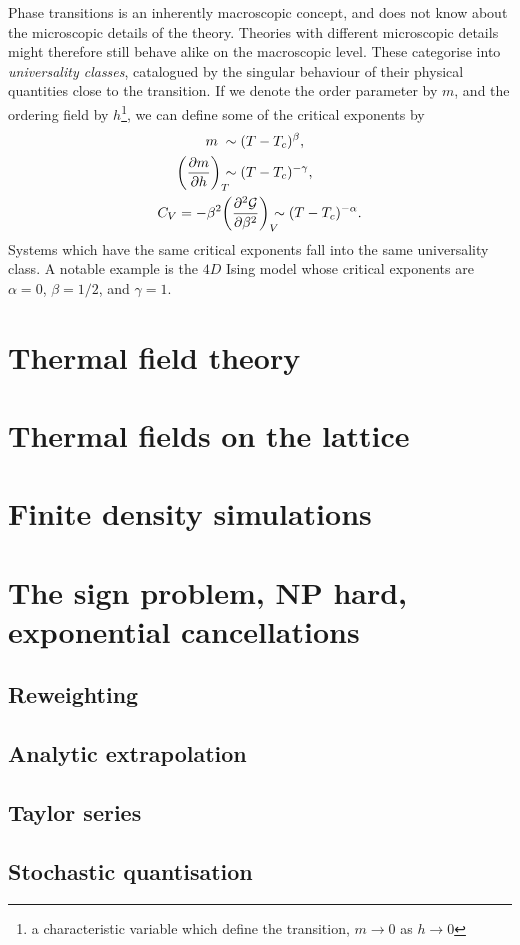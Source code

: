 Phase transitions is an inherently macroscopic concept, and does not know about
the microscopic details of the theory. Theories with different microscopic
details might therefore still behave alike on the macroscopic level. These
categorise into \emph{universality classes}, catalogued by the singular
behaviour of their physical quantities close to the transition. If we denote the
order parameter by $m$, and the ordering field by $h$\footnote{a characteristic
variable which define the transition, $m\to0$ as $h\to0$}, we can define some of
the critical exponents by
%
\begin{align}
  m \;&\sim (T - T_c)^{\beta}, \\
  \bigg(\frac{\partial m}{\partial h}\bigg)_{\mathrlap{T}} &\sim (T - T_c)^{-\gamma}, \\
  C_V = - \beta^2 &\bigg(\frac{\partial^2 \mathcal{G}}{\partial
    \beta^2}\bigg)_{\mathrlap{V}} \sim (T - T_c)^{-\alpha}.
\end{align}
%
Systems which have the same critical exponents fall into the same universality
class. A notable example is the $4D$ Ising model whose critical exponents are
$\alpha = 0$, $\beta = 1/2$, and $\gamma = 1$.


\section{Thermal field theory} \label{sec-thermal-field-theory}

\section{Thermal fields on the lattice} \label{sec-thermal-lattice-theory}

\section{Finite density simulations} \label{sec-finite-density-lattice}

\section{The sign problem, NP hard, exponential cancellations}
\label{sec-sign-problem}

\subsection{Reweighting}
\subsection{Analytic extrapolation}
\subsection{Taylor series}
\subsection{Stochastic quantisation}
